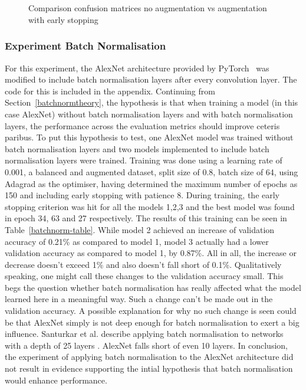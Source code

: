 \begin{figure}[ht]
\begin{subfigure}{0.45\columnwidth}
		~\label{fig:augmentationearly}
	\end{subfigure}
	\caption{Comparison confusion matrices no augmentation vs augmentation with early stopping}~\label{fig:augearlycombined}
\end{figure}



\subsubsection{Experiment Batch Normalisation}
For this experiment, the AlexNet architecture provided by PyTorch~\cite{pytorchAlexNet} was modified to include batch normalisation layers after every convolution layer. The code for this is included in the appendix. Continuing from Section~\ref{batchnormtheory}, the hypothesis is that when training a model (in this case AlexNet) without batch normalisation layers and with batch normalisation layers, the performance across the evaluation metrics should improve ceteris paribus. To put this hypothesis to test, one AlexNet model was trained without batch normalisation layers and two models implemented to include batch normalisation layers were trained. Training was done using a learning rate of 0.001, a balanced and augmented dataset, split size of 0.8, batch size of 64, using Adagrad as the optimiser, having determined the maximum number of epochs as 150 and including early stopping with patience 8. During training, the early stopping criterion was hit for all the models 1,2,3 and the best model was found in epoch 34, 63 and 27 respectively. The results of this training can be seen in Table~\ref{batchnorm-table}. While model 2 achieved an increase of validation accuracy of 0.21\% as compared to model 1, model 3 actually had a lower validation accuracy as compared to model 1, by 0.87\%. All in all, the increase or decrease doesn't exceed 1\% and also doesn't fall short of 0.1\%. Qualitatively speaking, one might call these changes to the validation accuracy small. This begs the question whether batch normalisation has really affected what the model learned here in a meaningful way. Such a change can't be made out in the validation accuracy. A possible explanation for why no such change is seen could be that AlexNet simply is not deep enough for batch normalisation to exert a big influence. Santurkar et al\@. describe applying batch normalisation to networks with a depth of 25 layers \citep{santurkar2018does}. AlexNet falls short of even 10 layers. In conclusion, the experiment of applying batch normalisation to the AlexNet architecture did not result in evidence supporting the intial hypothesis that batch normalisation would enhance performance.

